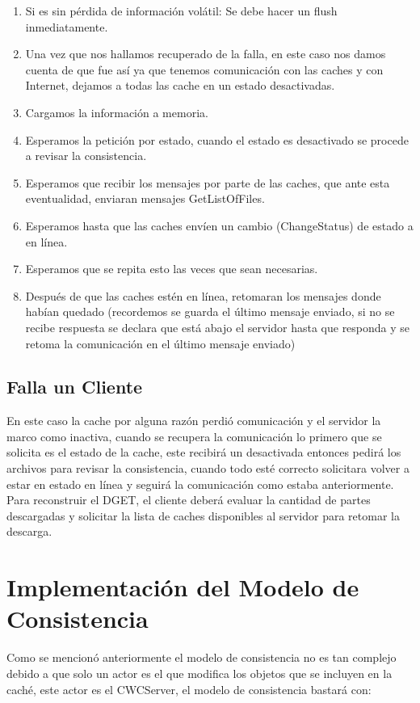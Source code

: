 \begin{enumerate}
\item Si es sin pérdida de información volátil: Se debe hacer un flush inmediatamente.
\item Una vez que nos hallamos recuperado de la falla, en este caso nos damos cuenta de que fue así ya que tenemos comunicación con las caches y con Internet, dejamos a todas las cache en un estado desactivadas.
\item Cargamos la información a memoria.
\item Esperamos la petición por estado, cuando el estado es desactivado se procede a revisar la consistencia.
\item Esperamos que recibir los mensajes por parte de las caches, que ante esta eventualidad, enviaran mensajes GetListOfFiles.
\item Esperamos hasta que las caches envíen un cambio (ChangeStatus) de estado a en línea.
\item Esperamos que se repita esto las veces que sean necesarias.
\item Después de que las caches estén en línea, retomaran los mensajes donde habían quedado (recordemos se guarda el último mensaje enviado, si no se recibe respuesta se declara que está abajo el servidor hasta que responda y se retoma la comunicación en el último mensaje enviado)
\end{enumerate}

\subsection{Falla un Cliente}
En este caso la cache por alguna razón perdió comunicación y el servidor la marco como inactiva, cuando se recupera la comunicación lo primero que se solicita es el estado de la cache, este recibirá un desactivada entonces pedirá los archivos para revisar la consistencia, cuando todo esté correcto solicitara volver a estar en estado en línea y seguirá la comunicación como estaba anteriormente.
Para reconstruir el DGET, el cliente deberá evaluar la cantidad de partes descargadas y solicitar la lista de caches disponibles al servidor para retomar la descarga.

\section{Implementación del Modelo de Consistencia}
Como se mencionó anteriormente el modelo de consistencia no es tan complejo debido a que solo un actor es el que modifica los objetos que se incluyen en la caché, este actor es el CWCServer, el modelo de consistencia bastará con:

